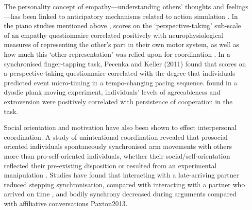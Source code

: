 \begin{CJK}{UTF8}{gbsn}
The personality concept of empathy—understanding others’ thoughts and feelings—has been linked to anticipatory mechanisms related to action simulation \citep{Sevdalis2014,Keller2014}.  In the piano studies mentioned above \citep{Novembre2012}, scores on the ‘perspective-taking’ sub-scale of an empathy questionnaire correlated positively with neurophysiological measures of representing the other’s part in their own motor system, as well as how much this ‘other-representation’ was relied upon for coordination \citep{Novembre2014a}.  In a synchronised finger-tapping task, Pecenka and Keller (2011) found that scores on a perspective-taking questionnaire correlated with the degree that individuals predicted event micro-timing in a tempo-changing pacing sequence.  \textcite{Richardson2007} found in a dyadic plank moving experiment, individuals’ levels of agreeableness and extroversion were positively correlated with persistence of cooperation in the task.

Social orientation and motivation have also been shown to effect interpersonal coordination.  A study of unintentional coordination revealed that prosocial-oriented individuals spontaneously synchronised arm movements with others more than pro-self-oriented individuals, whether their social/self-orientation reflected their pre-existing disposition or resulted from an experimental manipulation \citep{Lumsden2012}.  Studies have found that interacting with a late-arriving partner reduced stepping synchronisation, compared with interacting with a partner who arrived on time \citep{Miles2010}, and bodily synchrony decreased during arguments compared with affiliative conversations Paxton2013.


\end{CJK}
